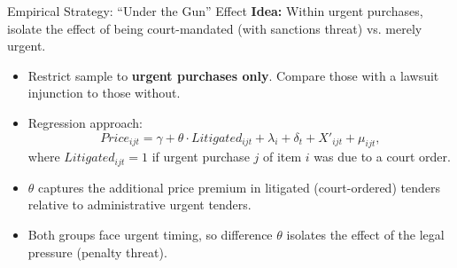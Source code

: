 \documentclass[aspectratio=169]{beamer}
\begin{document}
\begin{frame}{Empirical Strategy: ``Under the Gun'' Effect}
  \textbf{Idea:} Within urgent purchases, isolate the effect of being court-mandated (with sanctions threat) vs. merely urgent.
  \medskip
  \begin{itemize}
    \item Restrict sample to \textbf{urgent purchases only}. Compare those with a lawsuit injunction to those without.
    \item Regression approach:
          $$Price_{ijt} = \gamma + \theta \cdot Litigated_{ijt} + \lambda_{i} + \delta_{t} + X'_{ijt} + \mu_{ijt},$$
          where $Litigated_{ijt}=1$ if urgent purchase $j$ of item $i$ was due to a court order.
    \item $\theta$ captures the additional price premium in litigated (court-ordered) tenders relative to administrative urgent tenders.
    \item Both groups face urgent timing, so difference $\theta$ isolates the effect of the legal pressure (penalty threat).
  \end{itemize}
\end{frame}
\end{document}
